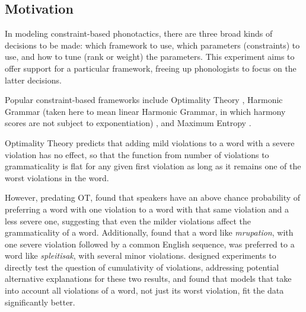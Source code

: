 \subsection{Motivation}

In modeling constraint-based phonotactics, there are three broad kinds of decisions to be made: which framework
to use, which parameters (constraints) to use, and how to tune (rank or weight) the parameters. This experiment
aims to offer support for a particular framework, freeing up phonologists to focus on the latter decisions.

Popular constraint-based frameworks include Optimality Theory \citep{Prince1993/2004}, Harmonic Grammar (taken here to mean linear Harmonic
Grammar, in which harmony scores are not subject to exponentiation) \citep{Legendre1990c,Smolensky2006b,Pater2009,Potts2010}, and Maximum Entropy
\citep{Goldwater2003}.





Optimality Theory predicts that adding mild
violations to a word with a severe violation has no effect, so that the
function from number of violations to grammaticality is flat for any given
first violation as long as it remains one of the worst violations in the word.

However, predating OT, \citet{Ohala1986} found that speakers have an above
chance probability of preferring a word with one violation to a word with that
same violation and a less severe one, suggesting that even the milder violations
affect the grammaticality of a word. Additionally, \citet{Coleman1997} found
that a word like \textit{mrupation}, with one severe violation followed by a
common English sequence, was preferred to a word like \textit{spleitisak}, with
several minor violations.  \citet{Albright_clusters_2008} designed experiments
to directly test the question of cumulativity of violations, addressing
potential alternative explanations for these two results, and found that models
that take into account all violations of a word, not just its worst violation,
fit the data significantly better.

